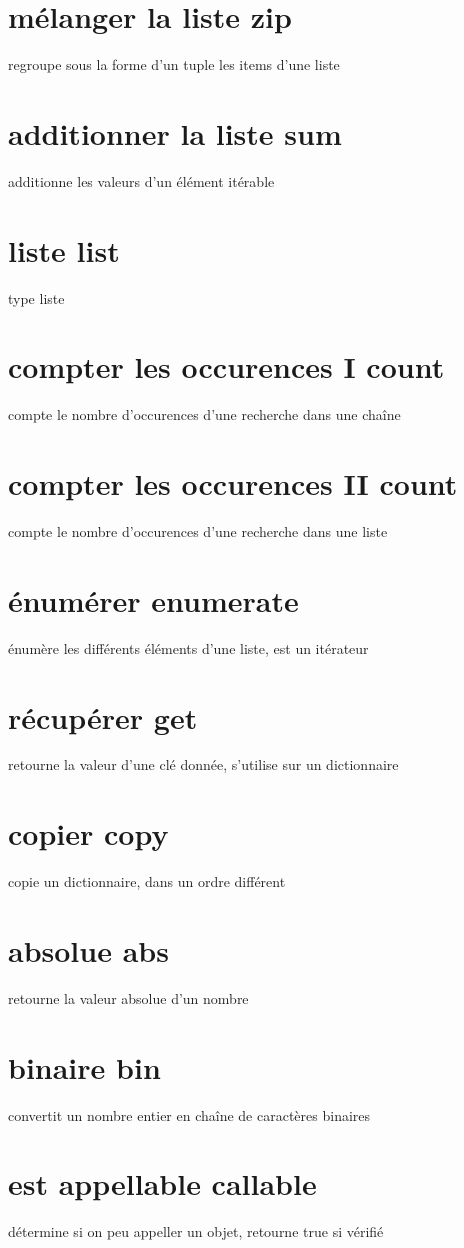\documentclass{book}
\begin{document}
\section{mélanger la liste zip }
  regroupe sous la forme d'un tuple les items d'une liste
\section{additionner la liste sum }
  additionne les valeurs d'un élément itérable 
\section{liste list }
  type liste
\section{compter les occurences I count }
  compte le nombre d'occurences d'une recherche dans une chaîne
\section{compter les occurences II count }
  compte le nombre d'occurences d'une recherche dans une liste
\section{énumérer enumerate }
  énumère les différents éléments d'une liste, est un itérateur 
\section{récupérer get}  retourne la valeur d'une clé donnée, s'utilise sur un dictionnaire
\section{copier copy }
  copie un dictionnaire, dans un ordre différent
\section{absolue abs }
  retourne la valeur absolue d'un nombre
\section{binaire bin }
  convertit un nombre entier en chaîne de caractères binaires
\section{est appellable callable }
  détermine si on peu appeller un objet, retourne true si vérifié
\end{document}

